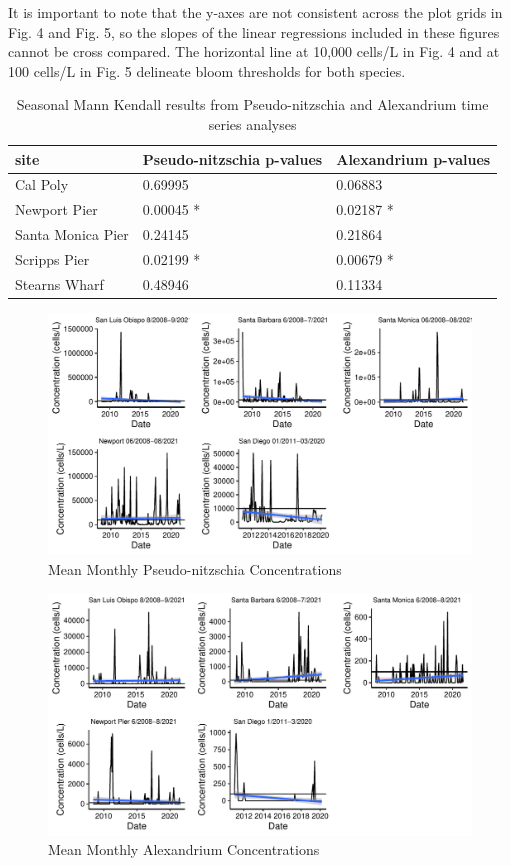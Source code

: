 \documentclass[
  12pt,
]{article}
\begin{document}
It is important to note that the y-axes are not consistent across the
plot grids in Fig. 4 and Fig. 5, so the slopes of the linear regressions
included in these figures cannot be cross compared. The horizontal line
at 10,000 cells/L in Fig. 4 and at 100 cells/L in Fig. 5 delineate bloom
thresholds for both species.

\begin{longtable}[t]{lll}
\caption{\label{tab:Table 4}Seasonal Mann Kendall results from Pseudo-nitzschia and Alexandrium time series analyses}\\
\toprule
site & Pseudo-nitzschia p-values & Alexandrium p-values\\
\midrule
Cal Poly & 0.69995 & 0.06883\\
Newport Pier & 0.00045 * & 0.02187 *\\
Santa Monica Pier & 0.24145 & 0.21864\\
Scripps Pier & 0.02199 * & 0.00679 *\\
Stearns Wharf & 0.48946 & 0.11334\\
\bottomrule
\end{longtable}

\begin{figure}
\centering
\includegraphics{Habs_Final_Report_files/figure-latex/combining Pseudo-nitzschia figures-1.pdf}
\caption{Mean Monthly Pseudo-nitzschia Concentrations}
\end{figure}

\begin{figure}
\centering
\includegraphics{Habs_Final_Report_files/figure-latex/combining Alexandrium figures-1.pdf}
\caption{Mean Monthly Alexandrium Concentrations}
\end{figure}
\end{document}
